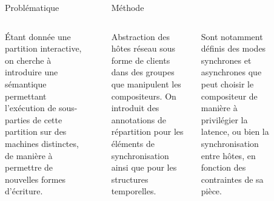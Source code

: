 \begin{columns}[t]
   \begin{column}{\sepwid}\end{column}
     \begin{column}{\onecolwid}
      \begin{block}{Problématique}
          \begin{columns}[t]
              \begin{column}{\onecolwid}\justify
                  Étant donnée une partition interactive, on cherche à introduire une sémantique permettant l'exécution de sous-parties de cette partition sur des machines distinctes, de manière à permettre de nouvelles formes d'écriture.
                \end{column}
            \end{columns}        
      \end{block}
     \end{column}
     \begin{column}{\sepwid}\end{column}
     \begin{column}{\twocolwid}
         \begin{block}{Méthode}             
             \begin{columns}[t]	                 
                 \begin{column}{\onecolwid}\justify
                     Abstraction des hôtes réseau sous forme de clients dans des groupes que manipulent les compositeurs. On introduit des annotations de répartition pour les éléments de synchronisation ainsi que pour les structures temporelles.
                     \end{column}
                     \begin{column}{\onecolwid}\justify
                     	Sont notamment définis des modes synchrones et asynchrones que peut choisir le compositeur de manière à privilégier la latence, ou bien la synchronisation entre hôtes, en fonction des contraintes de sa pièce.
                        \end{column}
                \end{columns}                 
            \end{block}
      \end{column}
      \begin{column}{\sepwid}\end{column}
      \begin{column}{\onecolwid}

\end{column}
\end{columns}
